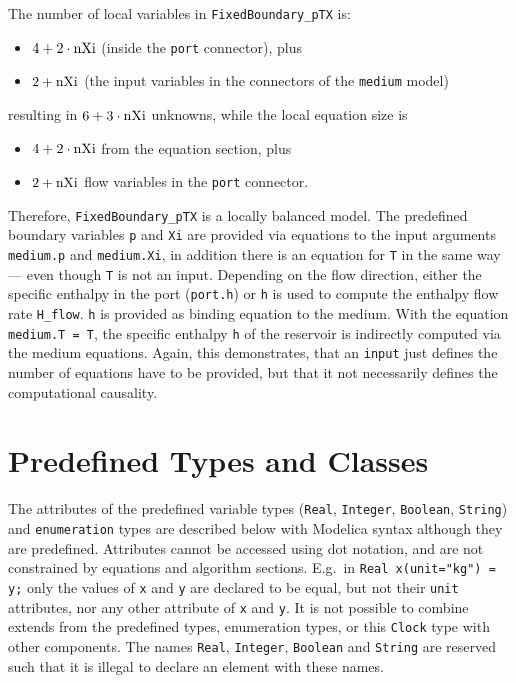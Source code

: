 \begin{example}
The number of local variables in \lstinline!FixedBoundary_pTX! is:
\begin{itemize}
\item
  $4 + 2 \cdot \text{\lstinline!nXi!}$ (inside the \lstinline!port! connector), plus
\item
  $2 + \text{\lstinline!nXi!}$ (the input variables in the connectors of the \lstinline!medium! model)
\end{itemize}
resulting in $6 + 3 \cdot \text{\lstinline!nXi!}$ unknowns, while the local equation size is
\begin{itemize}
\item
  $4 + 2 \cdot \text{\lstinline!nXi!}$ from the equation section, plus
\item
  $2 + \text{\lstinline!nXi!}$ flow variables in the \lstinline!port! connector.
\end{itemize}

Therefore, \lstinline!FixedBoundary_pTX! is a locally balanced model.  The predefined boundary variables \lstinline!p! and \lstinline!Xi! are
provided via equations to the input arguments \lstinline!medium.p! and \lstinline!medium.Xi!, in addition there is an equation for \lstinline!T!
in the same way --- even though \lstinline!T! is not an input.  Depending on the flow direction, either the specific enthalpy in the port
(\lstinline!port.h!) or \lstinline!h! is used to compute the enthalpy flow rate \lstinline!H_flow!.  \lstinline!h! is provided as binding equation
to the medium.  With the equation \lstinline!medium.T = T!, the specific enthalpy \lstinline!h! of the reservoir is indirectly computed via the
medium equations.  Again, this demonstrates, that an \lstinline!input! just defines the number of equations have to be provided, but that it not
necessarily defines the computational causality.
\end{example}

\section{Predefined Types and Classes}\label{predefined-types-and-classes}

The attributes of the predefined variable types (\lstinline!Real!, \lstinline!Integer!, \lstinline!Boolean!,
\lstinline!String!) and \lstinline!enumeration! types are described below with Modelica syntax
although they are predefined. Attributes cannot be accessed using dot
notation, and are not constrained by equations and algorithm sections.
E.g.\ in \lstinline!Real x(unit="kg") = y;! only the values of \lstinline!x! and \lstinline!y! are declared
to be equal, but not their \lstinline!unit! attributes, nor any other attribute of \lstinline!x!
and \lstinline!y!. It is not possible to combine extends from the predefined types,
enumeration types, or this \lstinline!Clock! type with other components. The names
\lstinline!Real!, \lstinline!Integer!, \lstinline!Boolean! and \lstinline!String! are reserved such that it is illegal
to declare an element with these names.

